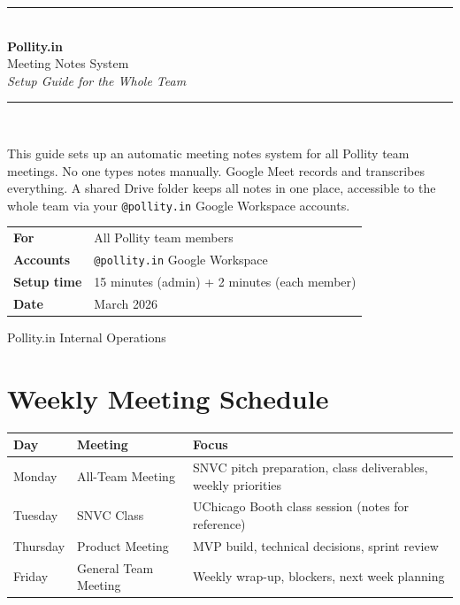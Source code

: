 \documentclass[11pt, a4paper]{article}
\begin{document}
\begin{titlepage}
\centering
\vspace*{2cm}
{\color{pollityblue}\rule{\linewidth}{1.5pt}}\\[0.4cm]
{\Huge\bfseries\color{pollityblue} Pollity.in}\\[0.3cm]
{\Large Meeting Notes System}\\[0.2cm]
{\large\itshape Setup Guide for the Whole Team}\\[0.3cm]
{\color{pollityblue}\rule{\linewidth}{1.5pt}}\\[1.5cm]

\begin{tcolorbox}[colback=pollityblue!8, colframe=pollityblue, sharp corners, width=0.85\linewidth]
\centering
This guide sets up an automatic meeting notes system for all Pollity team meetings.
No one types notes manually. Google Meet records and transcribes everything.
A shared Drive folder keeps all notes in one place, accessible to the whole team
via your \texttt{@pollity.in} Google Workspace accounts.
\end{tcolorbox}

\vspace{1.5cm}

\begin{tabular}{ll}
\toprule
\textbf{For}        & All Pollity team members \\
\textbf{Accounts}   & \texttt{@pollity.in} Google Workspace \\
\textbf{Setup time} & 15 minutes (admin) + 2 minutes (each member) \\
\textbf{Date}       & March 2026 \\
\bottomrule
\end{tabular}

\vfill
{\small\color{gray} Pollity.in \textbar{} Internal Operations}
\end{titlepage}

\tableofcontents
\newpage

\section{Weekly Meeting Schedule}

\renewcommand{\arraystretch}{1.4}
\begin{tabularx}{\linewidth}{llX}
\toprule
\textbf{Day} & \textbf{Meeting} & \textbf{Focus} \\
\midrule
Monday    & All-Team Meeting      & SNVC pitch preparation, class deliverables, weekly priorities \\
Tuesday   & SNVC Class            & UChicago Booth class session (notes for reference) \\
Thursday  & Product Meeting       & MVP build, technical decisions, sprint review \\
Friday    & General Team Meeting  & Weekly wrap-up, blockers, next week planning \\
\bottomrule
\end{tabularx}
\end{document}
